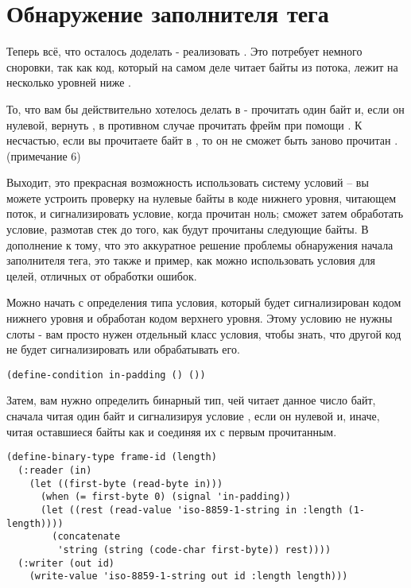 \section{Обнаружение заполнителя тега}

Теперь всё, что осталось доделать - реализовать . Это потребует немного
сноровки, так как код, который на самом деле читает байты из потока, лежит на несколько
уровней ниже .

То, что вам бы действительно хотелось делать в  - прочитать один байт и,
если он нулевой, вернуть , в противном случае прочитать фрейм при помощи
. К несчастью, если вы прочитаете байт в , то он не
сможет быть заново прочитан .(примечание 6)

Выходит, это прекрасная возможность использовать систему условий -- вы можете устроить
проверку на нулевые байты в коде нижнего уровня, читающем поток, и сигнализировать
условие, когда прочитан ноль;  сможет затем обработать условие, размотав
стек до того, как будут прочитаны следующие байты. В дополнение к тому, что это аккуратное
решение проблемы обнаружения начала заполнителя тега, это также и пример, как можно
использовать условия для целей, отличных от обработки ошибок.

Можно начать с определения типа условия, который будет сигнализирован кодом нижнего уровня
и обработан кодом верхнего уровня. Этому условию не нужны слоты - вам просто нужен
отдельный класс условия, чтобы знать, что другой код не будет сигнализировать или
обрабатывать его.

\begin{lstlisting}
(define-condition in-padding () ())
\end{lstlisting}

Затем, вам нужно определить бинарный тип, чей  читает данное число байт,
сначала читая один байт и сигнализируя условие , если он нулевой и,
иначе, читая оставшиеся байты как  и соединяя их с первым
прочитанным.

\begin{lstlisting}
(define-binary-type frame-id (length)
  (:reader (in)
    (let ((first-byte (read-byte in)))
      (when (= first-byte 0) (signal 'in-padding))
      (let ((rest (read-value 'iso-8859-1-string in :length (1- length))))
        (concatenate
         'string (string (code-char first-byte)) rest))))
  (:writer (out id)
    (write-value 'iso-8859-1-string out id :length length)))
\end{lstlisting}

